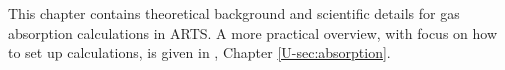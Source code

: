 \def\alphampmmtot{\alpha^{\mbox{\rm \small MPM89}}_{\mbox{\small tot}}} 
\def\alphampmntot{\alpha^{\mbox{\rm \small MPM93}}_{\mbox{\small tot}}} 
\def\alphapwrtot{\alpha^{\mbox{\rm \small R98}}_{\mbox{\small tot}}} 
\def\alphacptot{\alpha^{\mbox{\rm \small CP98}}_{\mbox{\small tot}}} 
%
\def\alphampmol{\alpha^{\mbox{\rm \small MPM87}}_{\mbox{\small $\ell$}}} 
\def\alphampmml{\alpha^{\mbox{\rm \small MPM89}}_{\mbox{\small $\ell$}}} 
\def\alphampmnl{\alpha^{\mbox{\rm \small MPM93}}_{\mbox{\small $\ell$}}} 
\def\alphampml{\alpha^{\mbox{\rm \small MPM}}_{\mbox{\small $\ell$}}} 
\def\alphapwrl{\alpha^{\mbox{\rm \small R98}}_{\mbox{\small $\ell$}}} 
\def\alphacpl{\alpha^{\mbox{\rm \small CP98}}_{\mbox{\small $\ell$}}} 
%
\def\alphampmoc{\alpha^{\mbox{\rm \small MPM87}}_{\rm c}} 
\def\alphampmmc{\alpha^{\mbox{\rm \small MPM89}}_{\rm c}} 
\def\alphampmnc{\alpha^{\mbox{\rm \small MPM93}}_{\rm c}} 
\def\alphapwrc{\alpha^{\mbox{\rm \small R98}}_{\rm c}} 
\def\alphacpc{\alpha^{\mbox{\rm \small CP98}}_{\rm c}} 
%
\def\gamk{\gamma_{\mbox{\rm \small k}}}
\def\gamc{\gamma_{\mbox{\rm \small c}}}
%
\def\ws{w_{\mbox{\rm \small s,k}}}
\def\xs{x_{\mbox{\rm \small s,k}}}
\def\wf{w_{\mbox{\rm \small f,k}}}
\def\xf{x_{\mbox{\rm \small f,k}}}
%
\def\wn{\bar{\nu}}
\def\nucc{\nu_{\mbox{\rm \small c}}}
\def\nucut{\nu_{\mbox{\rm \small cutoff}}}
\def\nuo{\nu_{\mbox{\rm \small 0}}}
\def\nuk{\nu_{\mbox{\rm \small k}}}
%
\def\shape{F(\nu,\nuk)}
\def\shapec{F_{c}(\nu,\nuk)}
\def\shapefp{f_{c}(\nu,+\nuk)}
\def\shapefm{f_{c}(\nu,-\nuk)}
\def\shapefpm{f_{c}(\nu,\pm\nuk)}
\def\inten{S_{\mbox{\rm \small k}}(T)}
\def\inteno{S_{\mbox{\rm \small k}}(300\,K)}
\def\intencp{S_{\mbox{\rm \small 0}}(T)}
%
\def\cx{C_{\mbox{\rm \small x}}}
\def\cs{C_{\mbox{\rm \small H}_{2}\mbox{\rm \small O}}} 
\def\cf{C_{\mbox{\rm N}_{2}}} 
\def\cxo{C^{\mbox{\rm o}}_{\mbox{\rm \small X}}} 
\def\cso{C^{\mbox{\rm o}}_{\mbox{\rm \small H}_{2}\mbox{\rm \small O}}} 
\def\cfo{C^{\mbox{\rm o}}_{\mbox{\rm \small N}_{2}}} 
\def\cao{C^{\mbox{\rm o}}_{\mbox{\rm \small air}}}
\def\cdo{C^{\mbox{\rm o}}_{\mbox{\rm \small d}}}
\def\xx{{\rm n}_{\mbox{\rm \small  x}}} 
\def\xs{{\rm n}_{\mbox{\rm \small  s}}} 
\def\xf{{\rm n}_{\mbox{\rm \small  f}}} 
\def\xd{{\rm n}_{\mbox{\rm \small  d}}}
%

This chapter contains theoretical background and scientific details
for gas absorption calculations in ARTS. A more practical overview,
with focus on how to set up calculations, is given in \user, Chapter
\ref{U-sec:absorption}.

